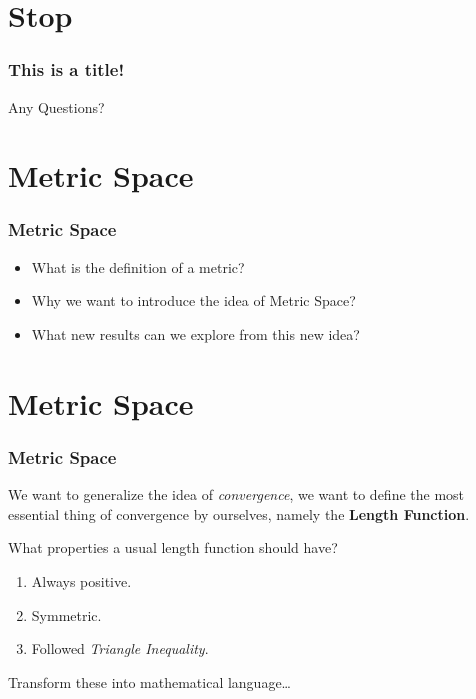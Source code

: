 \documentclass[12pt, t]{beamer}
\renewcommand{\emph}[1]{{\color{Turquoise3}\textsl{#1}}}
\begin{document}
\section{Stop}
\begin{frame}
    \frametitle{This is a title!}
    \vspace{6em}
    \begin{center}
        \Large{Any Questions?}
    \end{center}

\end{frame}

\section{Metric Space}
\begin{frame}
    \frametitle{Metric Space}
    \begin{itemize}
        \item What is the definition of a metric?
        \item Why we want to introduce the idea of Metric Space?
        \item What new results can we explore from this new idea?
    \end{itemize}
\end{frame}

\section{Metric Space}
\begin{frame}
    \frametitle{Metric Space}
    We want to generalize the idea of \emph{convergence}, we want to define the most essential thing of convergence by ourselves,
    namely the \textbf{Length Function}.\\

    \vspace{1em}

    What properties a usual length function should have?
    \begin{enumerate}
        \item Always positive.
        \item Symmetric.
        \item Followed \emph{Triangle Inequality}.
    \end{enumerate}

    \vspace{1em}

    Transform these into mathematical language\dots
\end{frame}
\end{document}
